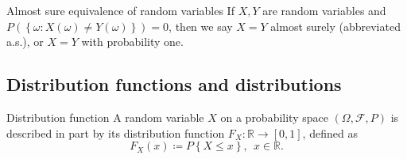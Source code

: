 
\begin{defn}{Almost sure equivalence of random variables}{}
If \( X, Y \) are random variables and \( P(\left\{ \omega :X(\omega )\neq Y(\omega )  \right\} )= 0 \), then we say \( X = Y \) almost surely (abbreviated a.s.), or \( X = Y \) with probability one. 

\end{defn}


\subsection{Distribution functions and distributions}

\begin{defn}{Distribution function}{}
    A random variable \( X \) on a probability space \( (\Omega , \mathcal{F} , P) \) is described in part by its distribution function \( F_{X} : \mathbb{R} \to [0,1] \), defined as 
    \[
        F_{X} (x)\coloneqq P\left\{ X\leq x \right\}, \ \ x\in \mathbb{R} .
    \]


\end{defn}

